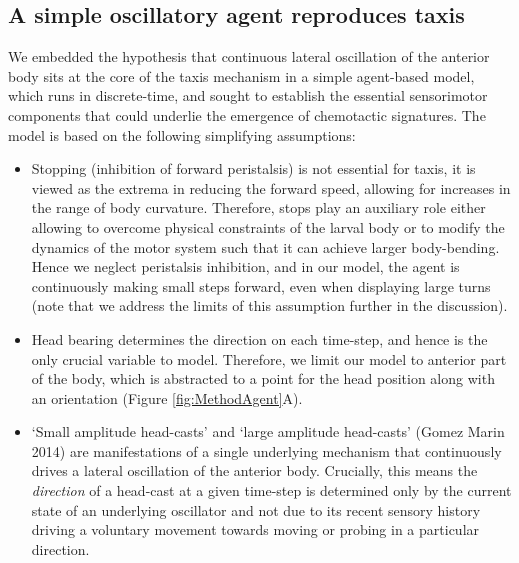 \documentclass[11pt,a4paper]{article}
\begin{document}
\subsection{A simple oscillatory agent reproduces taxis}
We embedded the hypothesis that continuous lateral oscillation of the anterior body sits at the core of the taxis mechanism in a simple agent-based model, which runs in discrete-time, and sought to establish the essential sensorimotor components that could underlie the emergence of chemotactic signatures. The model is based on the following simplifying assumptions:
\begin{itemize}
\item Stopping (inhibition of forward peristalsis) is not essential for taxis, it is viewed as the extrema in reducing the forward speed, allowing for increases in the range of body curvature. Therefore, stops play an auxiliary role either allowing to overcome physical constraints of the larval body or to modify the dynamics of the motor  system such that it can achieve larger body-bending. Hence we neglect peristalsis inhibition, and in our model, the agent is continuously making small steps forward, even when displaying large turns (note that we address the limits of this assumption further in the discussion).
\item Head bearing determines the direction on each time-step, and hence is the only crucial variable to model.
 Therefore, we limit our model to anterior part of the body, which is abstracted to a point for the head position along with an orientation (Figure \ref{fig:MethodAgent}A). 
\item ‘Small amplitude head-casts’ and ‘large amplitude head-casts’ (Gomez Marin 2014) are manifestations of a single underlying mechanism that continuously drives a lateral oscillation of the anterior body.
 Crucially, this means the {\it direction} of a head-cast at a given time-step is determined only by the current state of an underlying oscillator and not due to its recent sensory history driving a voluntary movement towards moving or probing in a particular direction.

\end{itemize}
\end{document}
